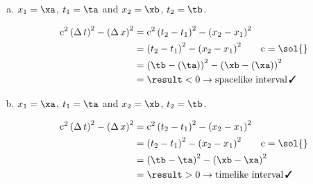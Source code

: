 \documentclass[pagesize,headsepline,10pt,parskip=half]{scrreprt}
\newcommand{\cmark}{\, \text{\ding{51}}}
\newcommand*\mdelta[1]{\ensuremath{\mathrm{\Delta\,}#1}}
\newcommand{\const}[1]{\mathrm{#1}}
\renewcommand{\c}{\const{c}}
\begin{document}
\begin{enumerate}[(a)]
        \item $x_1 = \xa$, $t_1 = \ta$ and $x_2 = \xb$, $t_2 = \tb$.
          \begin{samepage}
            \spacetimeintv{\result}{\xa}{\ta}{\xb}{\tb}
            \begin{align*}
              \c^2 \, {(\mdelta{t})}^2 - {(\mdelta{x})}^2
                &= \c^2 \, {(t_2 - t_1)}^2 - {(x_2 - x_1)}^2\\
                &= {(t_2 - t_1)}^2 - {(x_2 - x_1)}^2 \qquad \c = \sol{}\\
                &= {\left(\tb - \left(\ta\right)\right)}^2 - {\left(\xb - \left(\xa\right)\right)}^2\\
                &= \result < 0 \rightarrow \text{spacelike interval} \cmark
            \end{align*}
          \end{samepage}

        \item $x_1 = \xa$, $t_1 = \ta$ and $x_2 = \xb$, $t_2 = \tb$.
          \begin{samepage}
            \spacetimeintv{\result}{\xa}{\ta}{\xb}{\tb}
            \begin{align*}
              \c^2 \, {(\mdelta{t})}^2 - {(\mdelta{x})}^2
                &= \c^2 \, {(t_2 - t_1)}^2 - {(x_2 - x_1)}^2\\
                &= {(t_2 - t_1)}^2 - {(x_2 - x_1)}^2 \qquad \c = \sol{}\\
                &= {\left(\tb - \ta\right)}^2 - {\left(\xb - \xa\right)}^2\\
                &= \result > 0 \rightarrow \text{timelike interval} \cmark
            \end{align*}
          \end{samepage}


\end{enumerate}
\end{document}
